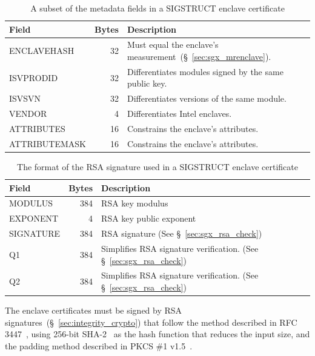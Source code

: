 \begin{table}[hbt]
  \centering
  \begin{tabularx}{\columnwidth}{| l | r | X |}
  \hline
  \textbf{Field} & \textbf{Bytes} & \textbf{Description} \\
  \hline
  ENCLAVEHASH & 32 & Must equal the enclave's
                     measurement~(\S~\ref{sec:sgx_mrenclave}). \\
  \hline
  ISVPRODID & 32 & Differentiates modules signed by the same public key. \\
  \hline
  ISVSVN & 32 & Differentiates versions of the same module. \\
  \hline
  VENDOR & 4 & Differentiates Intel enclaves. \\
  \hline
  ATTRIBUTES & 16 & Constrains the enclave's attributes. \\
  \hline
  ATTRIBUTEMASK & 16 & Constrains the enclave's attributes. \\
  \hline
  \end{tabularx}
  \caption{
    A subset of the metadata fields in a SIGSTRUCT enclave certificate
  }
  \label{fig:sgx_sigstruct_info}
\end{table}

\begin{table}[hbt]
  \centering
  \begin{tabularx}{\columnwidth}{| l | r | X |}
  \hline
  \textbf{Field} & \textbf{Bytes} & \textbf{Description} \\
  \hline
  MODULUS & 384 & RSA key modulus \\
  \hline
  EXPONENT & 4 & RSA key public exponent \\
  \hline
  SIGNATURE & 384 & RSA signature (See \S~\ref{sec:sgx_rsa_check}) \\
  \hline
  Q1 & 384 & Simplifies RSA signature verification.
             (See \S~\ref{sec:sgx_rsa_check}) \\
  \hline
  Q2 & 384 & Simplifies RSA signature verification.
             (See \S~\ref{sec:sgx_rsa_check}) \\
  \hline
  \end{tabularx}
  \caption{
    The format of the RSA signature used in a SIGSTRUCT enclave certificate
  }
  \label{fig:sgx_sigstruct_rsa}
\end{table}

The enclave certificates must be signed by RSA
signatures~(\S~\ref{sec:integrity_crypto}) that follow the method described in
RFC 3447~\cite{jonsson2003pkcsv21}, using 256-bit SHA-2~\cite{fips2015shs} as
the hash function that reduces the input size, and the padding method described
in PKCS \#1 v1.5~\cite{kaliski1998pkcs1v15}.

